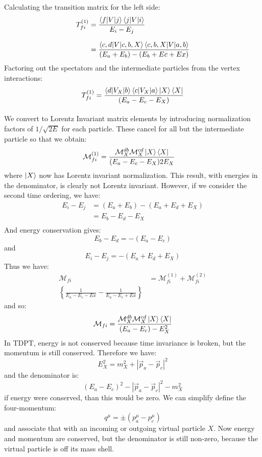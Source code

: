 \documentclass[12pt]{article}
\begin{document}
Calculating the transition matrix for the left side:
\begin{align*}
T_{fi}^{(1)} &= \frac{\braket{f|V|j}\braket{j|V|i}}{E_i - E_j} \\[7pt]
&= \frac{\braket{c,d|V|c,b,X}\braket{c,b,X|V|a,b}}{(E_a+E_b) - (E_b+Ec+Ex)}
\end{align*}
Factoring out the spectators and the intermediate particles from the vertex interactions:
\begin{align*}
T_{fi}^{(1)} &= \frac{\braket{d|V_X|b}\braket{c|V_X|a}\ket{X}\bra{X}}{(E_a-E_c-E_X)} \\[7pt]
\end{align*}
We convert to Lorentz Invariant matrix elements by introducing
normalization factors of $1/\sqrt{2E}$ for each particle.  These cancel for all but the intermediate particle so that we obtain:
\begin{align*}
\mathcal{M}_{fi}^{(1)} &= \frac{\mathcal{M}^{db}_X \mathcal{M}^{cd}_X \ket{X}\bra{X}}{(E_a - E_c - E_X) 2E_X}
\end{align*}
where $\ket{X}$ now has Lorentz invariant normalization.  This result, with energies in the denominator, is clearly not Lorentz invariant.  However, if we consider the second time ordering, we have:
\begin{align*}
  E_i - E_j &= (E_a + E_b) - (E_a + E_d + E_X) \\
            &= E_b - E_d - E_X \\
\end{align*}
And energy conservation gives:
$$E_b - E_d = -(E_a - E_c)$$
and 
$$E_i - E_j = - (E_a + E_d + E_X)$$
Thus we have:
\begin{align*}
\mathcal{M}_{fi} &= \mathcal{M}_{fi}^{(1)} + \mathcal{M}_{fi}^{(2)}\\
\left\{\frac{1}{E_a-E_c-Ex} - \frac{1}{E_a-E_c+Ex} \right\}
\end{align*}
and so:
\begin{equation}
\mathcal{M}_{fi} = \frac{\mathcal{M}^{db}_X \mathcal{M}^{cd}_X \ket{X}\bra{X}}{(E_a-E_c) - E_X^2}
\end{equation}
In TDPT, energy is not conserved because time invariance is broken, but the momentum is still conserved.  Therefore we have:
$$E_X^2 = m_X^2 + |\vec{p}_a - \vec{p}_c|^2$$
and the denominator is:
$$(E_a-E_c)^2 - |\vec{p}_a - \vec{p}_c|^2 - m_X^2$$
if energy were conserved, than this would be zero.  We can simplify define the four-momentum:
$$q^\mu = \pm(p_a^\mu - p_c^\mu) $$
and associate that with an incoming or outgoing virtual particle $X$.  Now energy and
momentum are conserved, but the denominator is still non-zero, because
the virtual particle is off its mass shell.
\end{document}
